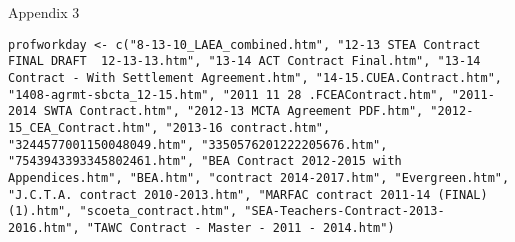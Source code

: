 \begin{center}
Appendix 3
\end{center}

\begin{lstlisting}
profworkday <- c("8-13-10_LAEA_combined.htm", "12-13 STEA Contract FINAL DRAFT  12-13-13.htm", "13-14 ACT Contract Final.htm", "13-14 Contract - With Settlement Agreement.htm", "14-15.CUEA.Contract.htm", "1408-agrmt-sbcta_12-15.htm", "2011 11 28 .FCEAContract.htm", "2011-2014 SWTA Contract.htm", "2012-13 MCTA Agreement PDF.htm", "2012-15_CEA_Contract.htm", "2013-16 contract.htm", "3244577001150048049.htm", "3350576201222205676.htm", "7543943393345802461.htm", "BEA Contract 2012-2015 with Appendices.htm", "BEA.htm", "contract 2014-2017.htm", "Evergreen.htm", "J.C.T.A. contract 2010-2013.htm", "MARFAC contract 2011-14 (FINAL) (1).htm", "scoeta_contract.htm", "SEA-Teachers-Contract-2013-2016.htm", "TAWC Contract - Master - 2011 - 2014.htm")
\end{lstlisting}